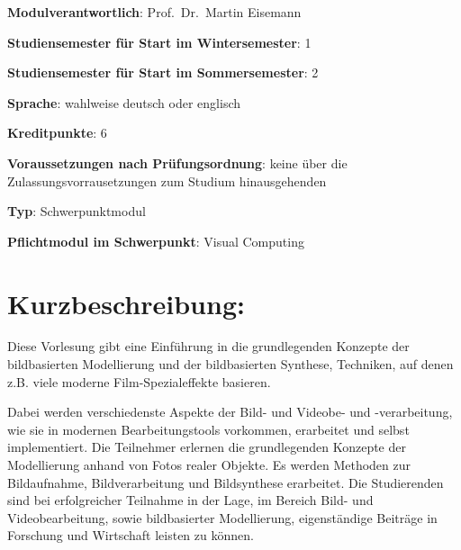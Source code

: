 \begin{modulHead}
\textbf{Modulverantwortlich}: Prof.~Dr.~Martin
Eisemann
\end{modulHead}
\begin{modulHead}
\textbf{Studiensemester für
Start im Wintersemester}:
1
\end{modulHead}
\begin{modulHead}
\textbf{Studiensemester für Start
im Sommersemester}:
2
\end{modulHead}
\begin{modulHead}
\textbf{Sprache}: wahlweise deutsch
oder englisch
\end{modulHead}
\begin{modulHead}
\textbf{Kreditpunkte}:
6
\end{modulHead}
\begin{modulHead}
\textbf{Voraussetzungen nach
Prüfungsordnung}: keine über die Zulassungsvorrausetzungen zum Studium
hinausgehenden
\end{modulHead}
\begin{modulHead}
\textbf{Typ}:
Schwerpunktmodul
\end{modulHead}
\begin{modulHead}
\textbf{Pflichtmodul
im Schwerpunkt}: Visual Computing
\end{modulHead}


\section*{Kurzbeschreibung:\label{/mi-2017/modulbeschreibungen-master/MA_VC_Modul_BildbasierteComputergrafik}}\label{kurzbeschreibungpathlabelmi-2017modulbeschreibungen-mastermaux5fvcux5fmodulux5fbildbasiertecomputergrafik}

Diese Vorlesung gibt eine Einführung in die grundlegenden Konzepte der
bildbasierten Modellierung und der bildbasierten Synthese, Techniken,
auf denen z.B. viele moderne Film-Spezialeffekte basieren.

Dabei werden verschiedenste Aspekte der Bild- und Videobe- und
-verarbeitung, wie sie in modernen Bearbeitungstools vorkommen,
erarbeitet und selbst implementiert. Die Teilnehmer erlernen die
grundlegenden Konzepte der Modellierung anhand von Fotos realer Objekte.
Es werden Methoden zur Bildaufnahme, Bildverarbeitung und Bildsynthese
erarbeitet. Die Studierenden sind bei erfolgreicher Teilnahme in der
Lage, im Bereich Bild- und Videobearbeitung, sowie bildbasierter
Modellierung, eigenständige Beiträge in Forschung und Wirtschaft leisten
zu können.

